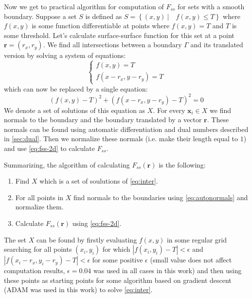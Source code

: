 \documentclass[reprint,amsmath,amssymb,aps,pre,showkeys,showpacs]{revtex4-1}
\begin{document}
Now we get to practical algorithm for computation of $F_{ss}$ for sets with a
smooth boundary. Suppose a set $S$ is defined as
$S = \left\{ (x, y) \ | \quad f(x, y) \le T \right\}$ where $f(x, y)$ is some
function differentiable at points where $f(x, y) = T$ and $T$ is some
threshold. Let's calculate surface-surface function for this set at a point
$\bm{r} = (r_x, r_y)$. We find all intersections between a boundary $\Gamma$ and
its translated version by solving a system of equations:
\begin{equation*}
  \left\{
  \begin{array}{l}
    f(x, y) = T \\
    f(x-r_x, y-r_y) = T
  \end{array}
  \right.
\end{equation*}
which can now be replaced by a single equation:
\begin{equation}
  (f(x, y) - T)^2 + (f(x-r_x, y-r_y) - T)^2 = 0 \label{eq:inter}
\end{equation}
We denote a set of solutions of this equation as $X$. For every $\bm{x}_i \in X$
we find normals to the boundary and the boundary translated by a vector
$\bm{r}$. These normals can be found using automatic differentiation and dual
numbers described in \cref{sec:dual}. Then we normalize these normals (i.e. make
their length equal to $1$) and use \cref{eq:fss-2d} to calculate $F_{ss}$.

Summarizing, the algorithm of calculating $F_{ss}(\bm{r})$ is the following:
\begin{enumerate}
\item Find $X$ which is a set of soulutions of \cref{eq:inter}.
\item For all points in $X$ find normals to the boundaries using
  \cref{eq:autonormals} and normalize them.
\item Calculate $F_{ss}(\bm{r})$ using \cref{eq:fss-2d}.
\end{enumerate}

The set $X$ can be found by firstly evaluating $f(x, y)$ in some regular grid
searching for all points $(x_i, y_i)$ for which $|f(x_i, y_i) - T| < \epsilon$
and $|f(x_i - r_x, y_i - r_y) - T| < \epsilon$ for some positive $\epsilon$ 
(small value does not affect computation results, $\epsilon=0.04$ was used in
all cases in this work) and then using these points as starting points for some
algorithm based on gradient descent (ADAM \cite{adam} was used in this work) to
solve \cref{eq:inter}.
\end{document}

